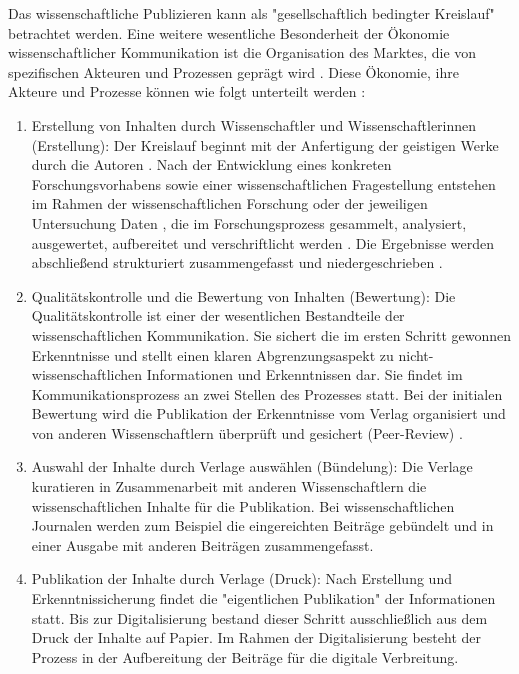 Das wissenschaftliche Publizieren kann als "gesellschaftlich bedingter Kreislauf" \cite{schirmbacher_2009_wisspub} betrachtet werden. Eine weitere wesentliche Besonderheit der Ökonomie wissenschaftlicher Kommunikation ist die Organisation des Marktes, die von spezifischen Akteuren und Prozessen geprägt wird \cite{Hess_2006}. Diese Ökonomie, ihre Akteure und Prozesse können wie folgt unterteilt werden \cite{cite:11b} \cite{Hess_2006}:
\begin{enumerate}
\item Erstellung von Inhalten durch Wissenschaftler und Wissenschaftlerinnen (Erstellung): Der Kreislauf beginnt mit der Anfertigung der geistigen Werke durch die Autoren \cite{schirmbacher_2009_wisspub}. Nach der Entwicklung eines konkreten Forschungsvorhabens sowie einer wissenschaftlichen Fragestellung entstehen im Rahmen der wissenschaftlichen Forschung oder der jeweiligen Untersuchung Daten \cite{cite:11c}, die im Forschungsprozess gesammelt, analysiert, ausgewertet, aufbereitet und verschriftlicht werden \cite{cite:11d}. Die Ergebnisse werden abschließend strukturiert zusammengefasst und niedergeschrieben \cite{Hess_2006}.
\item Qualitätskontrolle und die Bewertung von Inhalten (Bewertung):
Die Qualitätskontrolle ist einer der wesentlichen Bestandteile der wissenschaftlichen Kommunikation. Sie sichert die im ersten Schritt gewonnen Erkenntnisse \cite{cite:11e} und stellt einen klaren Abgrenzungsaspekt zu nicht-wissenschaftlichen Informationen und Erkenntnissen dar\cite{cite:11f}. Sie findet im Kommunikationsprozess an zwei Stellen des Prozesses statt. Bei der initialen Bewertung wird die Publikation der Erkenntnisse vom Verlag organisiert \cite{schirmbacher_2009_wisspub} und von anderen Wissenschaftlern überprüft und gesichert (Peer-Review) \cite{Hess_2006}.
\item Auswahl der Inhalte durch Verlage auswählen (Bündelung):
Die Verlage kuratieren in Zusammenarbeit mit anderen Wissenschaftlern die wissenschaftlichen Inhalte für die Publikation. Bei wissenschaftlichen Journalen werden zum Beispiel die eingereichten Beiträge gebündelt und in einer Ausgabe mit anderen Beiträgen zusammengefasst.
\item Publikation der Inhalte durch Verlage (Druck):
Nach Erstellung und Erkenntnissicherung findet die "eigentlichen Publikation" \cite{schirmbacher_2009_wisspub} der Informationen statt. Bis zur Digitalisierung bestand dieser Schritt ausschließlich aus dem Druck der Inhalte auf Papier.\cite{cite:11h} Im Rahmen der Digitalisierung besteht der Prozess in der Aufbereitung der Beiträge für die digitale Verbreitung.

\end{enumerate}
